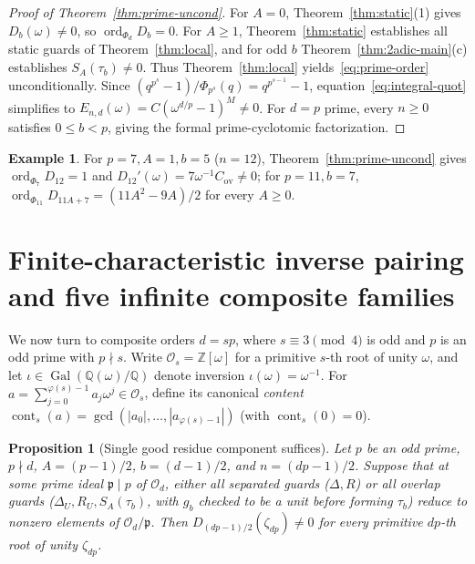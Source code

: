 \documentclass[11pt,reqno]{amsart}
\numberwithin{equation}{section}
\newtheorem{proposition}[theorem]{Proposition}
\theoremstyle{definition}
\newtheorem{example}[theorem]{Example}
\theoremstyle{remark}
\newcommand{\Q}{\mathbb{Q}}
\newcommand{\Z}{\mathbb{Z}}
\newcommand{\ord}{\operatorname{ord}}
\newcommand{\cont}{\operatorname{cont}}
\begin{document}
\begin{proof}[Proof of Theorem~\ref{thm:prime-uncond}]
For $A=0$, Theorem~\ref{thm:static}(1) gives $D_b(\omega)\neq 0$, so $\ord_{\Phi_d} D_b = 0$. For $A\ge 1$, Theorem~\ref{thm:static} establishes all static guards of Theorem~\ref{thm:local}, and for odd $b$ Theorem~\ref{thm:2adic-main}(c) establishes $S_A(\tau_b)\neq 0$. Thus Theorem~\ref{thm:local} yields~\eqref{eq:prime-order} unconditionally. Since $(q^{p^s}-1)/\Phi_{p^s}(q) = q^{p^{s-1}}-1$, equation~\eqref{eq:integral-quot} simplifies to $E_{n,d}(\omega)=C(\omega^{d/p}-1)^M\neq 0$. For $d=p$ prime, every $n\ge 0$ satisfies $0\le b<p$, giving the formal prime-cyclotomic factorization.
\end{proof}

\begin{example}
For $p=7,A=1,b=5$ ($n=12$), Theorem~\ref{thm:prime-uncond} gives $\ord_{\Phi_7} D_{12}=1$ and $D_{12}'(\omega)=7\omega^{-1}C_{\mathrm{ov}}\neq 0$; for $p=11,b=7$, $\ord_{\Phi_{11}}D_{11A+7}=(11A^2-9A)/2$ for every $A\ge 0$.
\end{example}

\section{Finite-characteristic inverse pairing and five infinite composite families}
\label{sec:finite-char}

We now turn to composite orders $d=sp$, where $s\equiv 3\pmod 4$ is odd and $p$ is an odd prime with $p\nmid s$. Write $\mathcal{O}_s=\Z[\omega]$ for a primitive $s$-th root of unity $\omega$, and let $\iota\in\operatorname{Gal}(\Q(\omega)/\Q)$ denote inversion $\iota(\omega)=\omega^{-1}$. For $a=\sum_{j=0}^{\varphi(s)-1}a_j\omega^j\in\mathcal{O}_s$, define its canonical \emph{content} $\cont_s(a)=\gcd(|a_0|,\ldots,|a_{\varphi(s)-1}|)$ (with $\cont_s(0)=0$).

\begin{proposition}[Single good residue component suffices]
\label{prop:one-comp}
Let $p$ be an odd prime, $p\nmid d$, $A=(p-1)/2$, $b=(d-1)/2$, and $n=(dp-1)/2$. Suppose that at some prime ideal $\mathfrak{p}\mid p$ of $\mathcal{O}_d$, either all separated guards ($\Delta,R$) or all overlap guards ($\Delta_U,R_U,S_A(\tau_b)$, with $g_b$ checked to be a unit before forming $\tau_b$) reduce to nonzero elements of $\mathcal{O}_d/\mathfrak{p}$. Then $D_{(dp-1)/2}(\zeta_{dp})\neq 0$ for every primitive $dp$-th root of unity $\zeta_{dp}$.
\end{proposition}
\end{document}
